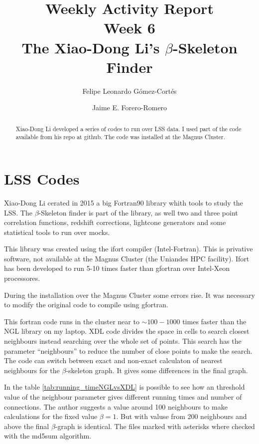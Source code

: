 \documentclass[preprint]{aastex62}
\begin{document}
\title{Weekly Activity Report\\Week 6\\The Xiao-Dong Li's $\beta$-Skeleton Finder}


\author{Felipe Leonardo Gómez-Cortés}

\nocollaboration

\author{Jaime E. Forero-Romero}


\begin{abstract}
  Xiao-Dong Li developed a series of codes to run over LSS data. I used part of the code
  available from his repo at github. The code was installed at the Magnus Cluster.
  
\end{abstract}

\section{LSS Codes}
Xiao-Dong Li cerated in 2015 a big Fortran90 library whith tools to study the LSS.
The $\beta$-Skeleton finder is part of the library, as well two and three point
correlation functions, redshift corrections, lightcone generators and some
statistical tools to run over mocks.

This library was created using the ifort compiler (Intel-Fortran). This is privative
software, not available at the Magnus Cluster (the Uniandes HPC facility). Ifort
has been developed to run 5-10 times faster than gfortran over Intel-Xeon
processores.

During the installation over the Magnus Cluster some errors rise. It was necessary
to modify the original code to compile using gfortran.

This fortran code runs in the cluster near to $\sim 100-1000$ times faster than the NGL
library on my laptop. XDL code divides the space in cells to search closest neighbours
instead searching over the whole set of points. This search has the parameter
``neighbours'' to reduce the number of close points to make the search. The code can
switch between exact and non-exact calculaton of nearest neighbours for the
$\beta$-skeleton graph. It gives some differences in the final graph.

In the table \ref{tab:running_timeNGLvsXDL}
is possible to see how an threshold value of the
neighbour parameter gives different running times and number of connections.
The author suggests a value around 100 neighbours to make calculations for the
fixed value $\beta=1$. But with valuse from 200 neighbours and above the final
$\beta$-graph is identical. The files marked with asterisks where checked with the
md5sum algorithm.
\end{document}

